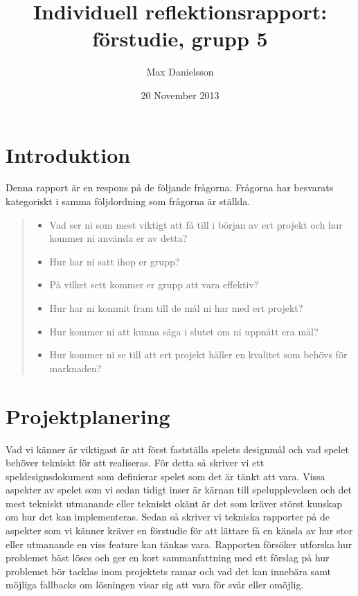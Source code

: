 \documentclass[a4paper]{report}
\title{Individuell reflektionsrapport: förstudie, grupp 5}
\author{Max Danielsson}
\date{20 November 2013}
\begin{document}
   \maketitle

\section*{Introduktion}

Denna rapport är en respons på de följande frågorna. Frågorna har besvarats
kategoriskt i samma följdordning som frågorna är ställda.

\begin{quote}
    \begin{itemize}

        \item Vad ser ni som mest viktigt att få till i början av ert projekt och hur kommer
                ni  använda er av detta?
        \item Hur har ni satt ihop er grupp?
        \item På vilket sett kommer er grupp att vara effektiv?
        \item Hur har ni kommit fram till de mål ni har med ert projekt?
        \item Hur kommer ni att kunna säga i slutet om ni uppnått era mål?
        \item Hur kommer ni se till att ert projekt håller en kvalitet som behövs för
                marknaden?
    \end{itemize}
\end{quote}

\section*{ Projektplanering }

Vad vi känner är viktigast är att först fastställa spelets designmål och vad
spelet behöver tekniskt för att realiseras. För detta så skriver vi ett
speldesignsdokument som definierar spelet som det är tänkt att vara. Vissa
aspekter av spelet som vi sedan tidigt inser är kärnan till spelupplevelsen och
det mest tekniskt utmanande eller tekniskt okänt är det som kräver störst
kunskap om hur det kan implementeras. Sedan så skriver vi tekniska rapporter
på de aspekter som vi känner kräver en förstudie för att lättare få en känsla
av hur stor eller utmanande en viss feature kan tänkas vara. Rapporten försöker
utforska hur problemet bäst löses och ger en kort sammanfattning med ett
förslag på hur problemet bör tacklas inom projektets ramar och vad det kan
innebära samt möjliga fallbacks om lösningen visar sig att vara för svår eller
omöjlig.
 
\end{document}
